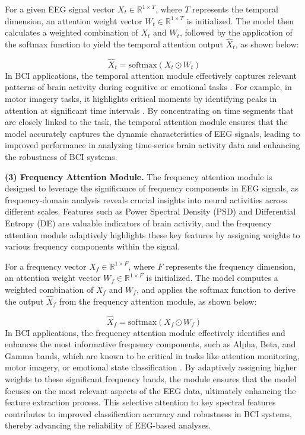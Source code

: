 \documentclass[preprint,12pt]{elsarticle}
\begin{document}
For a given EEG signal vector $X_t \in \mathbb{R}^{1 \times T}$, where $T$ represents the temporal dimension, an attention weight vector $W_t \in \mathbb{R}^{1 \times T}$ is initialized. The model then calculates a weighted combination of $X_t$ and $W_t$, followed by the application of the softmax function to yield the temporal attention output $\hat{X}_t$, as shown below:

\begin{equation}
\hat{X}_t= \text{softmax}(X_t \odot W_t) 
\end{equation}
In BCI applications, the temporal attention module effectively captures relevant patterns of brain activity during cognitive or emotional tasks \cite{zhang2022eeg, jia2020sst}. For example, in motor imagery tasks, it highlights critical moments by identifying peaks in attention at significant time intervals \cite{zhang2020motor, ma2022time}. By concentrating on time segments that are closely linked to the task, the temporal attention module ensures that the model accurately captures the dynamic characteristics of EEG signals, leading to improved performance in analyzing time-series brain activity data and enhancing the robustness of BCI systems.

\textbf{(3) Frequency Attention Module.} The frequency attention module is designed to leverage the significance of frequency components in EEG signals, as frequency-domain analysis reveals crucial insights into neural activities across different scales. Features such as Power Spectral Density (PSD) and Differential Entropy (DE) are valuable indicators of brain activity, and the frequency attention module adaptively highlights these key features by assigning weights to various frequency components within the signal.

For a frequency vector $X_f \in \mathbb{R}^{1 \times F}$, where $F$ represents the frequency dimension, an attention weight vector $W_f \in \mathbb{R}^{1 \times F}$ is initialized. The model computes a weighted combination of $X_f$ and $W_f$, and applies the softmax function to derive the output $\hat{X}_f$ from the frequency attention module, as shown below:

\begin{equation}
\hat{X}_f= \text{softmax}(X_f \odot W_f) 
\end{equation}
In BCI applications, the frequency attention module effectively identifies and enhances the most informative frequency components, such as Alpha, Beta, and Gamma bands, which are known to be critical in tasks like attention monitoring, motor imagery, or emotional state classification \cite{cai2021eeg, xiao20224d}. By adaptively assigning higher weights to these significant frequency bands, the module ensures that the model focuses on the most relevant aspects of the EEG data, ultimately enhancing the feature extraction process. This selective attention to key spectral features contributes to improved classification accuracy and robustness in BCI systems, thereby advancing the reliability of EEG-based analyses.
\end{document}

